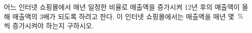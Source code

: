 어느 인터넷 쇼핑몰에서 매년 일정한 비율로 매출액을 증가시켜 12년 후의 매출액이 올해 매출액의 3배가 되도록 하려고 한다. 이 인터넷 쇼핑몰에서는 매출액을 매년 몇 $\mkern3mu \%$씩 증가시켜야 하는지 구하시오. 
